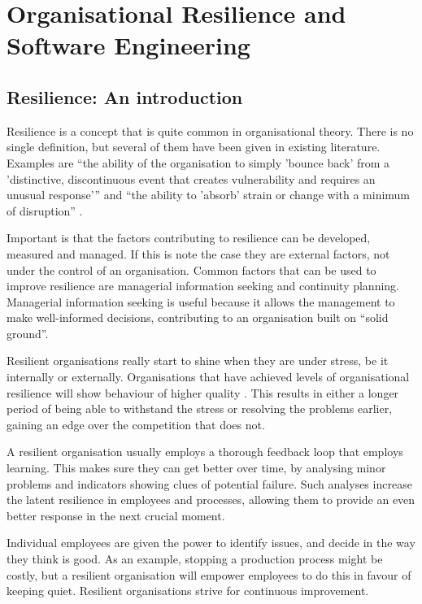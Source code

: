 \chapter{Organisational Resilience and Software Engineering}
\section{Resilience: An introduction}
Resilience is a concept that is quite common in organisational theory. 
There is no single definition, but several of them have been given in existing literature.
Examples are ``the ability of the organisation to simply 'bounce back' from a 'distinctive, discontinuous event that creates vulnerability and requires an unusual response'{''} \cite{JCCM:JCCM558} and ``the ability to 'absorb' strain or change with a minimum of disruption'' \cite{JCCM:JCCM558}.

Important is that the factors contributing to resilience can be developed, measured and managed.
If this is note the case they are external factors, not under the control of an organisation. 
Common factors that can be used to improve resilience are managerial information seeking and continuity planning.
Managerial information seeking is useful because it allows the management to make well-informed decisions, contributing to an organisation built on ``solid ground''.

Resilient organisations really start to shine when they are under stress, be it internally or externally. 
Organisations that have achieved levels of organisational resilience will show behaviour of higher quality \cite{vogus2007organizational}.
This results in either a longer period of being able to withstand the stress or resolving the problems earlier, gaining an edge over the competition that does not.

A resilient organisation usually employs a thorough feedback loop \cite{vogus2007organizational} that employs learning.
This makes sure they can get better over time, by analysing minor problems and indicators showing clues of potential failure. 
Such analyses increase the latent resilience in employees and processes, allowing them to provide an even better response in the next crucial moment.

Individual employees are given the power to identify issues, and decide in the way they think is good. 
As an example, stopping a production process might be costly, but a resilient organisation will empower employees to do this in favour of keeping quiet.
Resilient organisations strive for continuous improvement.

